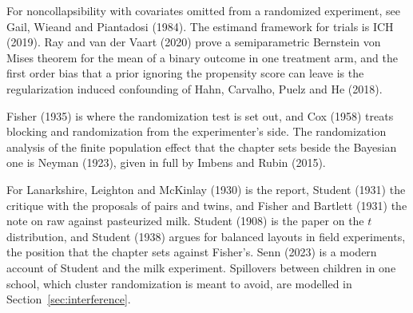 For noncollapsibility with covariates omitted from a randomized experiment, see Gail, Wieand and Piantadosi (1984). The estimand framework for trials is ICH (2019). Ray and van der Vaart (2020) prove a semiparametric Bernstein von Mises theorem for the mean of a binary outcome in one treatment arm, and the first order bias that a prior ignoring the propensity score can leave is the regularization induced confounding of Hahn, Carvalho, Puelz and He (2018).

Fisher (1935) is where the randomization test is set out, and Cox (1958) treats blocking and randomization from the experimenter's side. The randomization analysis of the finite population effect that the chapter sets beside the Bayesian one is Neyman (1923), given in full by Imbens and Rubin (2015).

For Lanarkshire, Leighton and McKinlay (1930) is the report, Student (1931) the critique with the proposals of pairs and twins, and Fisher and Bartlett (1931) the note on raw against pasteurized milk. Student (1908) is the paper on the $t$ distribution, and Student (1938) argues for balanced layouts in field experiments, the position that the chapter sets against Fisher's. Senn (2023) is a modern account of Student and the milk experiment. Spillovers between children in one school, which cluster randomization is meant to avoid, are modelled in Section~\ref{sec:interference}.

